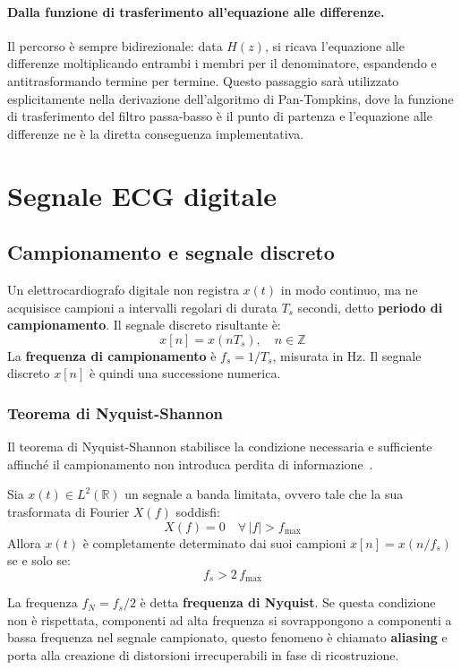 \paragraph{Dalla funzione di trasferimento all'equazione alle differenze.}
Il percorso è sempre bidirezionale: data $H(z)$, si ricava l'equazione alle differenze moltiplicando entrambi i membri per il denominatore, espandendo e antitrasformando termine per termine. Questo passaggio sarà utilizzato esplicitamente nella derivazione dell'algoritmo di Pan-Tompkins, dove la funzione di trasferimento del filtro passa-basso è il punto di partenza e l'equazione alle differenze ne è la diretta conseguenza implementativa.

\section{Segnale ECG digitale}
\subsection{Campionamento e segnale discreto}
Un elettrocardiografo digitale non registra $x(t)$ in modo continuo, ma ne acquisisce campioni a intervalli regolari di durata $T_s$ secondi, detto \textbf{periodo di campionamento}. Il segnale discreto risultante è:
\[
x[n] = x(nT_s), \quad n \in \mathbb{Z}
\]
La \textbf{frequenza di campionamento} è $f_s = 1/T_s$, misurata in Hz. Il segnale discreto $x[n]$ è quindi una successione numerica.

\subsubsection{Teorema di Nyquist-Shannon}
Il teorema di Nyquist-Shannon stabilisce la condizione necessaria e sufficiente affinché il campionamento non introduca perdita di informazione~\cite{nyquist1928, shannon1949}.

\begin{theorem}
	Sia $x(t) \in L^2(\mathbb{R})$ un segnale a banda limitata, ovvero tale che la sua trasformata di Fourier $X(f)$ soddisfi:
	\[
	X(f) = 0 \quad \forall\, |f| > f_{\max}
	\]
	Allora $x(t)$ è completamente determinato dai suoi campioni $x[n] = x(n/f_s)$ se e solo se:
	\[
	f_s > 2\, f_{\max}
	\]
\end{theorem}

La frequenza $f_N = f_s/2$ è detta \textbf{frequenza di Nyquist}. Se questa condizione non è rispettata, componenti ad alta frequenza si sovrappongono a componenti a bassa frequenza nel segnale campionato, questo fenomeno è chiamato \textbf{aliasing} e porta alla creazione di distorsioni irrecuperabili in fase di ricostruzione.

